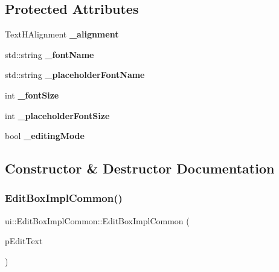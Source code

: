 \subsection*{Protected Attributes}
\begin{DoxyCompactItemize}
\item 
\mbox{\label{classui_1_1EditBoxImplCommon_a8a11dc20010a910d88bfbef492078821}} 
Text\+H\+Alignment {\bfseries \+\_\+alignment}
\item 
\mbox{\label{classui_1_1EditBoxImplCommon_aa79c2111a02aae5ccb481069b87de538}} 
std\+::string {\bfseries \+\_\+font\+Name}
\item 
\mbox{\label{classui_1_1EditBoxImplCommon_a92b34d6a8d2a9426426215b520bcb157}} 
std\+::string {\bfseries \+\_\+placeholder\+Font\+Name}
\item 
\mbox{\label{classui_1_1EditBoxImplCommon_aa7263992eb99db6c07e46f65031c2ffa}} 
int {\bfseries \+\_\+font\+Size}
\item 
\mbox{\label{classui_1_1EditBoxImplCommon_a89e2655f97b36236e56bb068ff4e2efc}} 
int {\bfseries \+\_\+placeholder\+Font\+Size}
\item 
\mbox{\label{classui_1_1EditBoxImplCommon_a6d32d89acc26bb4ab9ef23edf80a8eed}} 
bool {\bfseries \+\_\+editing\+Mode}
\end{DoxyCompactItemize}


\subsection{Constructor \& Destructor Documentation}
\mbox{\label{classui_1_1EditBoxImplCommon_adbe38c744b0a41d37097fa3e70d0d4a3}} 
\subsubsection{\texorpdfstring{Edit\+Box\+Impl\+Common()}{EditBoxImplCommon()}\hspace{0.1cm}{\footnotesize\ttfamily [1/2]}}
{\footnotesize\ttfamily ui\+::\+Edit\+Box\+Impl\+Common\+::\+Edit\+Box\+Impl\+Common (\begin{DoxyParamCaption}\item[{\hyperlink{classui_1_1EditBox}{Edit\+Box} $\ast$}]{p\+Edit\+Text }\end{DoxyParamCaption})}

